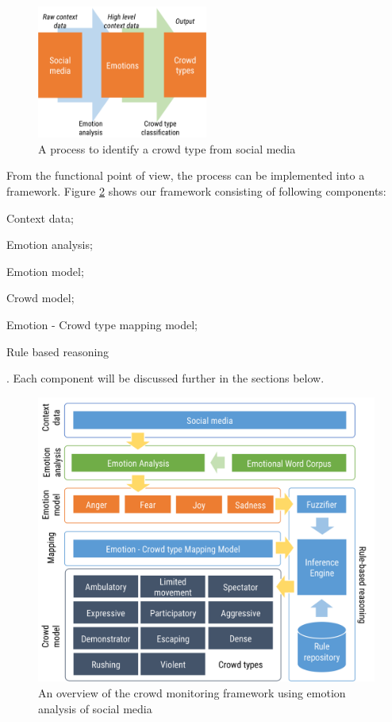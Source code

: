 \begin{figure}[htb!] 
\centering    
\includegraphics[width=0.5\textwidth]{ProcessOverview}
\caption{A process to identify a crowd type from social media}
\label{fig:processOverview}
\end{figure}

From the functional point of view, the process can be implemented into a framework. Figure \ref{fig:frameworkOverview} shows our framework consisting of following components:
\begin{inparaenum}[i)]
\item Context data;
\item Emotion analysis;
\item Emotion model;
\item Crowd model;
\item Emotion - Crowd type mapping model;
\item Rule based reasoning
\end{inparaenum}. Each component will be discussed further in the sections below.

\begin{figure}[htb!] 
\centering    
\includegraphics[width=1.0\textwidth]{FrameworkOverview}
\caption{An overview of the crowd monitoring framework using emotion analysis of social media}
\label{fig:frameworkOverview}
\end{figure}

